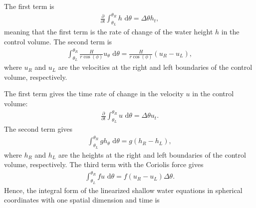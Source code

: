 The first term is 
\begin{align*}
    \frac{\partial}{\partial t} \int_{\theta_L}^{\theta_R} h \text{ d}\theta =  \Delta \theta h_t,
\end{align*}
meaning that the first term is the rate of change of the water height $h$ in the control volume.
The second term is
\begin{align*}
    \int_{\theta_L}^{\theta_R} \frac{H}{r \cos(\phi)} u_\theta \text{ d}\theta = \frac{H}{r \cos(\phi)} (u_R - u_L),
\end{align*}
where $u_R$ and $u_L$ are the velocities at the right and left boundaries of the control volume, respectively.



The first term gives the time rate of change in the velocity $u$ in the control volume:
\begin{align*}
    \frac{\partial}{\partial t} \int_{\theta_L}^{\theta_R} u \text{ d}\theta = \Delta \theta u_t.
\end{align*}
The second term gives 
\begin{align*}
    \int_{\theta_L}^{\theta_R} g h_\theta \text{ d}\theta = g(h_R - h_L),
\end{align*}
where $h_R$ and $h_L$ are the heights at the right and left boundaries of the control volume, respectively.
The third term with the Coriolis force gives
\begin{align*}
    \int_{\theta_L}^{\theta_R} fu \text{ d}\theta = f(u_R - u_L) \Delta \theta.
\end{align*} 
Hence, the integral form of the linearized shallow water equations in spherical coordinates with one spatial dimension and time is

